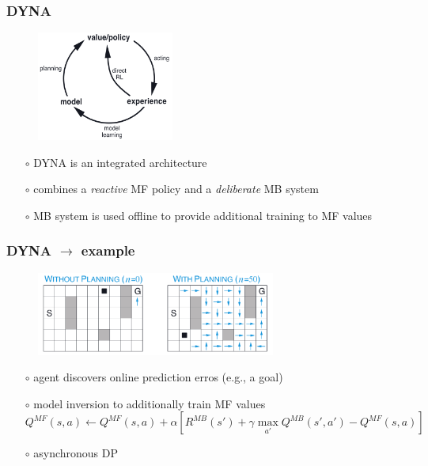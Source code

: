 \documentclass[aspectratio=169]{beamer}
\begin{document}
\begin{frame}
    \frametitle{DYNA} 
    \begin{figure}
        \centering
        \includegraphics[width=0.4\textwidth]{dyna.png}
    \end{figure}
    \hspace*{\fill} {\footnotesize \citet{suttonIntegratedArchitecturesLearning1990}}
    \begin{itemize}
        \item[$\circ$] DYNA is an integrated architecture
        \item[$\circ$] combines a \emph{reactive} MF policy and a \emph{deliberate} MB system 
        \item[$\circ$] MB system is used offline to provide additional training to MF values
    \end{itemize}
\end{frame}

\begin{frame}
    \frametitle{DYNA $\rightarrow$ example} 
    \begin{figure}
        \centering
        \includegraphics[width=0.7\textwidth]{dyna_eg.png}
    \end{figure}
    \begin{itemize}
        \item[$\circ$] agent discovers online prediction erros (e.g., a goal)
        \item[$\circ$] model inversion to additionally train MF values 
        $$ Q^{MF}(s,a) \leftarrow Q^{MF}(s,a) + \alpha [R^{MB}(s') + \gamma \max_{a'} Q^{MB}(s', a') - Q^{MF}(s,a)] $$
        \item[$\circ$] asynchronous DP
    \end{itemize}
\end{frame}
\end{document}
